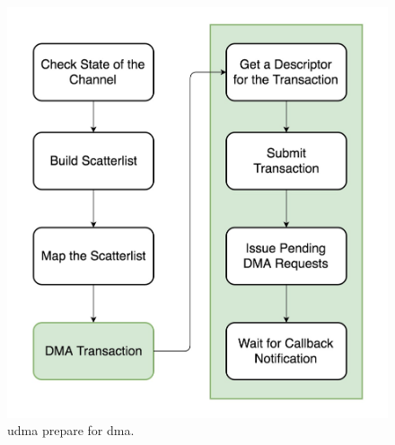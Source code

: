 \begin{figure}[!htb]
  \centering
  \includegraphics[scale=0.3]{images/udma_prepare_dma.jpg}
  \caption[Udma Prepare for DMA.]{udma prepare for dma.}
  \label{fig:Udma Prepare for DMA..}
\end{figure}



